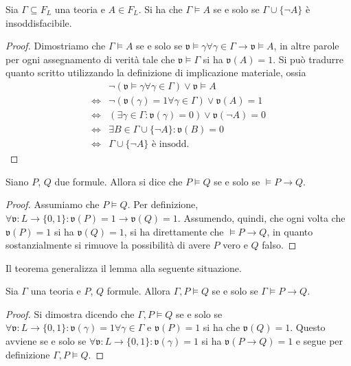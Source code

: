 \begin{lem}
Sia $\Gamma \subseteq F_L$ una teoria e $A \in F_L$. Si 
ha che $\Gamma \models A$ se e solo se $\Gamma \cup \{\neg A \}$ è insoddisfacibile. 
\end{lem}

\begin{proof}
Dimostriamo che $\Gamma \models A$ se e solo se 
$\mathfrak{v} \models \gamma \forall \gamma \in \Gamma \rightarrow \mathfrak{v}\models A$, 
in altre parole per ogni assegnamento di verità tale che $\mathfrak{v} \models \Gamma$ 
si ha $\mathfrak{v}(A) = 1$.
Si può tradurre quanto scritto utilizzando la definizione di implicazione materiale, 
ossia 
\begin{align*}
  &\neg (\mathfrak{v} \models \gamma \forall \gamma \in \Gamma) \lor \mathfrak{v}\models A \\
  \iff &\neg (\mathfrak{v}(\gamma) = 1 \forall \gamma \in \Gamma) \lor \mathfrak{v}(A) = 1\\
  \iff & (\exists \gamma \in \Gamma : \mathfrak{v}(\gamma) = 0) \lor \mathfrak{v}(\neg A) = 0 \\
  \iff & \exists B \in \Gamma \cup \{\neg A\}: \mathfrak{v}(B) = 0  \\
  \iff & \Gamma \cup \{\neg A\} \text{ è insodd.}
\end{align*}
\end{proof}

\begin{lem} Siano $P$, $Q$ due formule. Allora 
si dice che $P \models Q$ se e solo se $\models P \rightarrow Q$. 
\end{lem}
\begin{proof}
Assumiamo che $P \models Q$. Per definizione, 
$\forall \mathfrak{v}: L \rightarrow \{0,1\}:\mathfrak{v}(P) = 1 \rightarrow \mathfrak{v}(Q) = 1$. 
Assumendo, quindi, che ogni volta che $\mathfrak{v}(P) = 1$ si ha $\mathfrak{v}(Q) = 1$, 
si ha direttamente che $\models P\rightarrow Q$, in quanto sostanzialmente 
si rimuove la possibilità di avere $P$ vero e $Q$ falso.
\end{proof}

Il teorema generalizza il lemma alla seguente situazione. 
\begin{teo}
Sia $\Gamma$ una teoria 
e $P$, $Q$ formule. Allora $\Gamma,P \models Q$ se e solo se
$\Gamma \models P \rightarrow Q$. 
\end{teo}
\begin{proof}
Si dimostra dicendo che $\Gamma, P \models Q$ se e solo se 
$\forall \mathfrak{v}: L \rightarrow \{0,1\}: \mathfrak{v}(\gamma) = 1 \forall \gamma \in \Gamma$ e 
$\mathfrak{v}(P) = 1$ si ha che $\mathfrak{v}(Q) = 1$. Questo avviene se e solo se 
$\forall \mathfrak{v}:L \rightarrow \{0,1\} : \mathfrak{v}(\gamma) = 1$ si ha $\mathfrak{v}(P \rightarrow Q) = 1$ 
e segue per definizione $\Gamma, P \models Q$. 
\end{proof}

